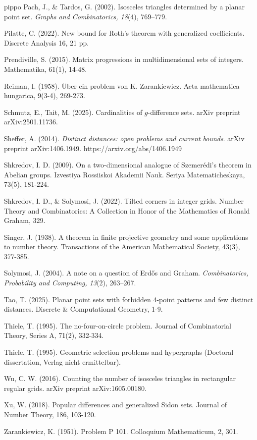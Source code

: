 \documentclass[11pt]{article}
\theoremstyle{plain}
\begin{document}
\begin{thebibliography}{pippo}
		 Pach, J., \& Tardos, G. (2002). Isosceles triangles determined by a planar point set. \textit{Graphs and Combinatorics, 18}(4), 769–779. %
		
		 Pilatte, C. (2022). New bound for Roth’s theorem with generalized coefficients. Discrete Analysis 16, 21 pp. 
		
		 Prendiville, S. (2015). Matrix progressions in multidimensional sets of integers. Mathematika, 61(1), 14-48.
		
		 Reiman, I. (1958). Über ein problem von K. Zarankiewicz. Acta mathematica hungarica, 9(3-4), 269-273.
		
		 Schmutz, E.,  Tait, M. (2025). Cardinalities of $ g $-difference sets. arXiv preprint arXiv:2501.11736.
		
		 Sheffer, A. (2014). \textit{Distinct distances: open problems and current bounds}. arXiv preprint arXiv:1406.1949. https://arxiv.org/abs/1406.1949
		
		 Shkredov, I. D. (2009). On a two-dimensional analogue of Szemerédi's theorem in Abelian groups. Izvestiya Rossiiskoi Akademii Nauk. Seriya Matematicheskaya, 73(5), 181-224.
		
		 Shkredov, I. D., \& Solymosi, J. (2022). Tilted corners in integer grids. Number Theory and Combinatorics: A Collection in Honor of the Mathematics of Ronald Graham, 329.
		
		
		 Singer, J. (1938). A theorem in finite projective geometry and some applications to number theory. Transactions of the American Mathematical Society, 43(3), 377-385.
		
		 Solymosi, J. (2004). A note on a question of Erdős and Graham. \textit{Combinatorics, Probability and Computing, 13}(2), 263–267.
		
		
		 Tao, T. (2025). Planar point sets with forbidden 4-point patterns and few distinct distances. Discrete \& Computational Geometry, 1-9.
		
		 Thiele, T. (1995). The no-four-on-circle problem. Journal of Combinatorial Theory, Series A, 71(2), 332-334.
		
		 Thiele, T. (1995). Geometric selection problems and hypergraphs (Doctoral dissertation, Verlag nicht ermittelbar).
		
		Wu, C. W. (2016). Counting the number of isosceles triangles in rectangular regular grids. arXiv preprint arXiv:1605.00180.
		
		 Xu, W. (2018). Popular differences and generalized Sidon sets. Journal of Number Theory, 186, 103-120.
		
		 Zarankiewicz, K. (1951). Problem P 101. Colloquium Mathematicum, 2, 301.
		
	\end{thebibliography}
\end{document}
